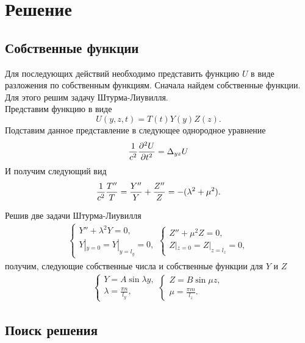 \chapter{Решение}

\section{Собственные функции}

Для последующих действий необходимо представить функцию $U$ в виде разложения по собственным функциям. Сначала найдем собственные функции. Для этого решим задачу Штурма-Лиувилля.\\
Представим функцию в виде
\[
U(y, z, t) = T(t)Y(y)Z(z).
\]
Подставим данное представление в следующее однородное уравнение
\[
\frac{1}{c^2} \frac{\partial^2 U}{\partial t^2} = \Delta_{yz} U\\
\]
И получим следующий вид
\[
\frac{1}{c^2}\frac{T''}{T} = \frac{Y''}{Y} + \frac{Z''}{Z} = -(\lambda^2 + \mu^2).\\
\]

Решив две задачи Штурма-Лиувилля
\[
\begin{array}{ll}
  \left\{
    \begin{array}{l}
      Y'' + \lambda^2Y = 0, \\
      Y|_{y=0} = Y|_{y=l_y} = 0,
    \end{array}
  \right.
  \left\{
    \begin{array}{l}
      Z'' + \mu^2Z = 0, \\
      Z|_{z=0} = Z|_{z=l_z} = 0,
    \end{array}
  \right.  
\end{array}
\]
получим, следующие собственные числа и собственные функции для $Y$ и $Z$
\[
\begin{array}{ll}
  \left\{
    \begin{array}{l}
      Y = A\sin\lambda y, \\
      \lambda = \frac{\pi n}{l_y},
    \end{array}
  \right.
  \left\{
    \begin{array}{l}
      Z = B\sin\mu z, \\
      \mu = \frac{\pi m}{l_z}.
    \end{array}
  \right.  
\end{array}
\]

\section{Поиск решения}

